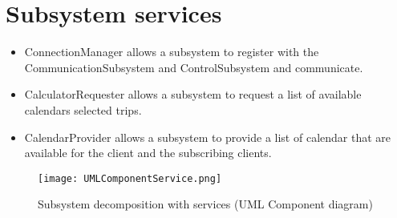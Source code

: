 \chapter*{Subsystem services}

\begin{itemize}
	\item ConnectionManager allows a subsystem to register with the CommunicationSubsystem and ControlSubsystem and communicate.
	\item CalculatorRequester allows a subsystem to request a list of available calendars selected trips.
	\item CalendarProvider allows a subsystem to provide a list of calendar that are available for the client and the subscribing clients. 
\end{itemize}

\begin{figure}[ht!]
\centering
\texttt{[image: UMLComponentService.png]}
\caption{Subsystem decomposition with services (UML Component diagram) \label{overflow}}
\end{figure}

